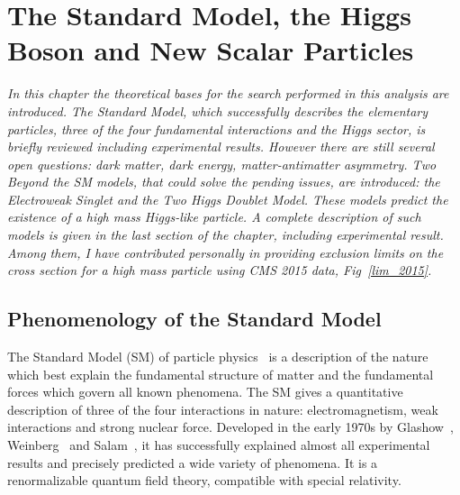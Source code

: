 \chapter{The Standard Model, the Higgs Boson and New Scalar Particles}
\label{cap1}

\textit{In this chapter the theoretical bases for the search performed in this analysis are introduced. The Standard Model, which successfully 
describes the elementary particles, three of the four fundamental interactions and the Higgs sector, is briefly reviewed including experimental results. 
However there are still several open questions: dark matter, dark energy, matter-antimatter asymmetry. 
Two  Beyond the SM models, that could solve the  pending issues, are introduced: the Electroweak Singlet  and the Two Higgs Doublet Model.  
These models  predict the existence of a high mass Higgs-like particle. A complete description of such models is given in the last section of the chapter, including experimental result. Among them, I have contributed personally in providing exclusion limits on the cross section for a high mass particle using CMS 2015 data, 
Fig~\ref{lim_2015}.}

\section{Phenomenology of the Standard Model}
The Standard Model (SM) of particle physics~\cite{Halzen:1984mc} is a description of the nature which best explain  the fundamental structure of matter and the fundamental forces which govern all known phenomena. The SM gives a quantitative description of three of the four interactions in nature: electromagnetism, weak interactions and  strong nuclear force.
Developed in the early 1970s by Glashow~\cite{GLASHOW1961579}, Weinberg~\cite{PhysRevLett.19.1264} and Salam~\cite{Salam:1968rm}, it has successfully explained almost
all experimental results and precisely predicted a wide variety of phenomena.
It is a renormalizable quantum field theory, compatible with special relativity.

